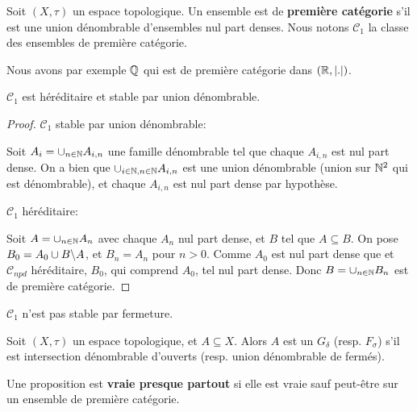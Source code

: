 \begin{definition}
	Soit $(X, \tau)$ un espace topologique.
	Un ensemble est de \textbf{première catégorie} s'il est une union
	dénombrable d'ensembles nul part denses. Nous notons $\mathcal{C}_{1}$ la
	classe des ensembles de première catégorie.
\end{definition}

Nous avons par exemple $\mathbb{Q}$ qui est de première catégorie dans $(\mathbb{R},
|.|)$.

\begin{proposition}
	$\mathcal{C}_{1}$ est héréditaire et stable par union
	dénombrable.
\end{proposition}

\begin{proof}
	$\mathcal{C}_{1}$ stable par union dénombrable:

	Soit $A_{i} = \cup_{n \in \mathbb{N}} A_{i, n}$ une famille dénombrable tel
	que chaque $A_{i, n}$ est nul part dense. On a bien que $\cup_{i \in \mathbb{N},
	n \in \mathbb{N}} A_{i, n}$ est une union dénombrable (union sur
	$\mathbb{N}^{2}$ qui est dénombrable), et chaque $A_{i, n}$
	est nul part dense par hypothèse.

	$\mathcal{C}_{1}$ héréditaire:
	
	Soit $A = \cup_{n \in \mathbb{N}} A_{n}$ avec chaque $A_{n}$ nul part dense,
	et $B$ tel que $A \subseteq B$. On pose $B_{0} = A_{0} \cup B\backslash
	A$, et $B_{n} = A_{n}$ pour $n > 0$. Comme $A_{0}$ est nul part dense que et
	$\mathcal{C}_{npd}$ héréditaire, $B_{0}$, qui comprend $A_{0}$, tel nul part
	dense. Donc $B = \cup_{n \in \mathbb{N}} B_{n}$ est de première catégorie.
\end{proof}

\begin{remarque}
	$\mathcal{C}_{1}$ n'est pas stable par fermeture.
\end{remarque}

\begin{definition}
	Soit $(X, \tau)$ un espace topologique, et $A \subseteq X$.
	Alors $A$ est un $G_{\delta}$ (resp. $F_{\sigma}$) s'il est intersection
	dénombrable d'ouverts (resp. union dénombrable de fermés).
\end{definition}

\begin{definition}
	Une proposition est \textbf{vraie presque partout} si elle est vraie sauf
	peut-être sur un ensemble de première catégorie.
\end{definition}


